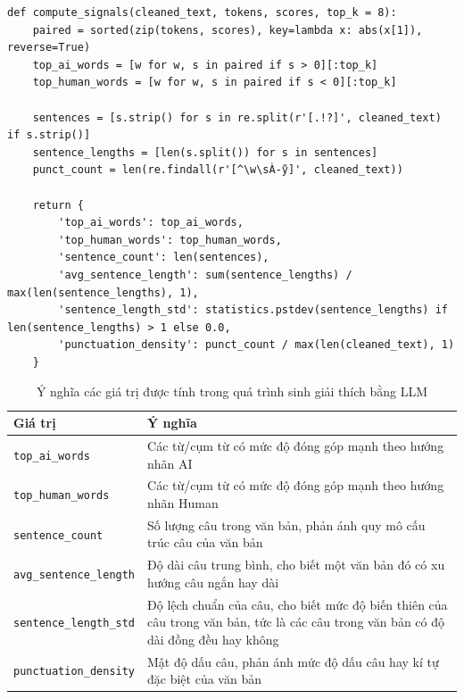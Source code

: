 \begin{lstlisting}[style=pythoncode]
def compute_signals(cleaned_text, tokens, scores, top_k = 8):
    paired = sorted(zip(tokens, scores), key=lambda x: abs(x[1]), reverse=True)
    top_ai_words = [w for w, s in paired if s > 0][:top_k]
    top_human_words = [w for w, s in paired if s < 0][:top_k]

    sentences = [s.strip() for s in re.split(r'[.!?]', cleaned_text) if s.strip()]
    sentence_lengths = [len(s.split()) for s in sentences]
    punct_count = len(re.findall(r'[^\w\sÀ-ỹ]', cleaned_text))

    return {
        'top_ai_words': top_ai_words,
        'top_human_words': top_human_words,
        'sentence_count': len(sentences),
        'avg_sentence_length': sum(sentence_lengths) / max(len(sentence_lengths), 1),
        'sentence_length_std': statistics.pstdev(sentence_lengths) if len(sentence_lengths) > 1 else 0.0,
        'punctuation_density': punct_count / max(len(cleaned_text), 1)
    }
\end{lstlisting}

\begin{table}[H]
\centering
\caption{Ý nghĩa các giá trị được tính trong quá trình sinh giải thích bằng LLM}
\label{tab:attribution-signals}
\begin{tabular}{|p{}|p{}|}
\hline
\textbf{Giá trị} & \textbf{Ý nghĩa} \\
\hline
\texttt{top\_ai\_words} & Các từ/cụm từ có mức độ đóng góp mạnh theo hướng nhãn AI \\
\hline
\texttt{top\_human\_words} & Các từ/cụm từ có mức độ đóng góp mạnh theo hướng nhãn Human \\
\hline
\texttt{sentence\_count} & Số lượng câu trong văn bản, phản ánh quy mô cấu trúc câu của văn bản \\
\hline
\texttt{avg\_sentence\_length} & Độ dài câu trung bình, cho biết một văn bản đó có xu hướng câu ngắn hay dài \\
\hline
\texttt{sentence\_length\_std} & Độ lệch chuẩn của câu, cho biết mức độ biến thiên của câu trong văn bản, tức là các câu trong văn bản có độ dài đồng đều hay không \\
\hline
\texttt{punctuation\_density} & Mật độ dấu câu, phản ánh mức độ dấu câu hay kí tự đặc biệt của văn bản \\
\hline
\end{tabular}
\end{table}

